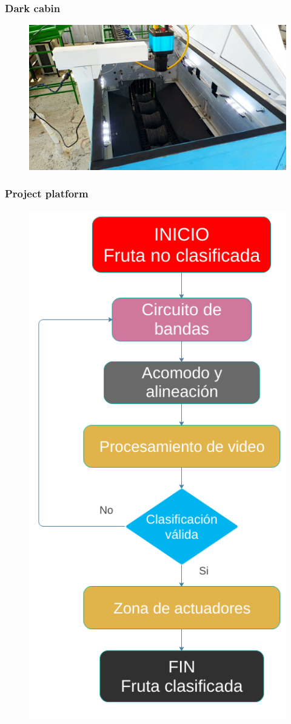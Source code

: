 \documentclass[
serif,
compress,
xcolor=table,
dvipsnames,
]{beamer}
\begin{document}
\begin{frame}
	\frametitle{Dark cabin}
	\begin{figure}[h]
		\centering
		\includegraphics[width=\linewidth]{DK}
		\label{trans}
	\end{figure}
\end{frame}

\begin{frame}
	\frametitle{Project platform}
	\begin{figure}[h]
		\centering
		\includegraphics[width=.35\linewidth]{F/diagramaflujomaquina}
		\label{trans}
	\end{figure}
\end{frame}
\end{document}
